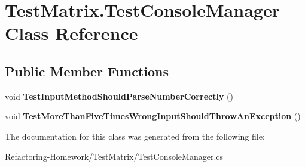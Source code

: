 \hypertarget{class_test_matrix_1_1_test_console_manager}{\section{Test\+Matrix.\+Test\+Console\+Manager Class Reference}
\label{class_test_matrix_1_1_test_console_manager}
}
\subsection*{Public Member Functions}
\begin{DoxyCompactItemize}
\item 
\hypertarget{class_test_matrix_1_1_test_console_manager_ac3cee3f3125135f5a77eb609edf778a0}{void {\bfseries Test\+Input\+Method\+Should\+Parse\+Number\+Correctly} ()}\label{class_test_matrix_1_1_test_console_manager_ac3cee3f3125135f5a77eb609edf778a0}

\item 
\hypertarget{class_test_matrix_1_1_test_console_manager_a18194933af1a84bee5702c0e8e5a9b4e}{void {\bfseries Test\+More\+Than\+Five\+Times\+Wrong\+Input\+Should\+Throw\+An\+Exception} ()}\label{class_test_matrix_1_1_test_console_manager_a18194933af1a84bee5702c0e8e5a9b4e}

\end{DoxyCompactItemize}


The documentation for this class was generated from the following file\+:\begin{DoxyCompactItemize}
\item 
Refactoring-\/\+Homework/\+Test\+Matrix/Test\+Console\+Manager.\+cs\end{DoxyCompactItemize}
